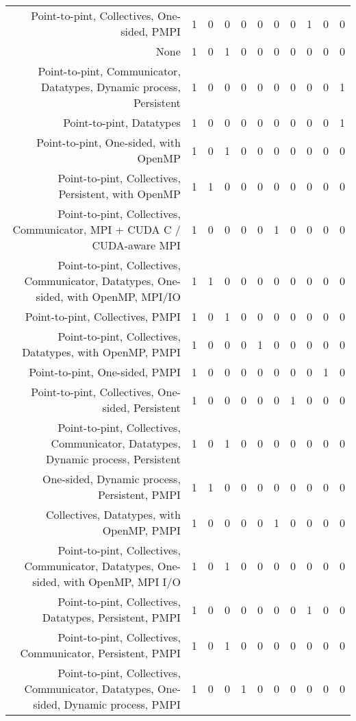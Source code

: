 {\begin{landscape}
\begin{longtable}[htb]{r|c|c|c|c|c|c|c|c|c|c}
{Point-to-pint, Collectives, One-sided, PMPI} & 1 & 0 & 0 & 0 & 0 & 0 & 0 & 1 & 0 & 0 \\%
{None} & 1 & 0 & 1 & 0 & 0 & 0 & 0 & 0 & 0 & 0 \\%
{Point-to-pint, Communicator, Datatypes, Dynamic process, Persistent} & 1 & 0 & 0 & 0 & 0 & 0 & 0 & 0 & 0 & 1 \\%
{Point-to-pint, Datatypes} & 1 & 0 & 0 & 0 & 0 & 0 & 0 & 0 & 0 & 1 \\%
{Point-to-pint, One-sided, with OpenMP} & 1 & 0 & 1 & 0 & 0 & 0 & 0 & 0 & 0 & 0 \\%
{Point-to-pint, Collectives, Persistent, with OpenMP} & 1 & 1 & 0 & 0 & 0 & 0 & 0 & 0 & 0 & 0 \\%
{Point-to-pint, Collectives, Communicator, MPI + CUDA C / CUDA-aware MPI} & 1 & 0 & 0 & 0 & 0 & 1 & 0 & 0 & 0 & 0 \\%
{Point-to-pint, Collectives, Communicator, Datatypes, One-sided, with OpenMP, MPI/IO} & 1 & 1 & 0 & 0 & 0 & 0 & 0 & 0 & 0 & 0 \\%
{Point-to-pint, Collectives, PMPI} & 1 & 0 & 1 & 0 & 0 & 0 & 0 & 0 & 0 & 0 \\%
{Point-to-pint, Collectives, Datatypes, with OpenMP, PMPI} & 1 & 0 & 0 & 0 & 1 & 0 & 0 & 0 & 0 & 0 \\%
{Point-to-pint, One-sided, PMPI} & 1 & 0 & 0 & 0 & 0 & 0 & 0 & 0 & 1 & 0 \\%
{Point-to-pint, Collectives, One-sided, Persistent} & 1 & 0 & 0 & 0 & 0 & 0 & 1 & 0 & 0 & 0 \\%
{Point-to-pint, Collectives, Communicator, Datatypes, Dynamic process, Persistent} & 1 & 0 & 1 & 0 & 0 & 0 & 0 & 0 & 0 & 0 \\%
{One-sided, Dynamic process, Persistent, PMPI} & 1 & 1 & 0 & 0 & 0 & 0 & 0 & 0 & 0 & 0 \\%
{Collectives, Datatypes, with OpenMP, PMPI} & 1 & 0 & 0 & 0 & 0 & 1 & 0 & 0 & 0 & 0 \\%
{Point-to-pint, Collectives, Communicator, Datatypes, One-sided, with OpenMP, MPI I/O} & 1 & 0 & 1 & 0 & 0 & 0 & 0 & 0 & 0 & 0 \\%
{Point-to-pint, Collectives, Datatypes, Persistent, PMPI} & 1 & 0 & 0 & 0 & 0 & 0 & 0 & 1 & 0 & 0 \\%
{Point-to-pint, Collectives, Communicator, Persistent, PMPI} & 1 & 0 & 1 & 0 & 0 & 0 & 0 & 0 & 0 & 0 \\%
{Point-to-pint, Collectives, Communicator, Datatypes, One-sided, Dynamic process, PMPI} & 1 & 0 & 0 & 1 & 0 & 0 & 0 & 0 & 0 & 0 \\%

\end{longtable}
\end{landscape}}
